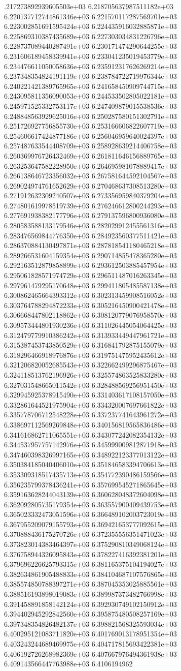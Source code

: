 .217273892939605503e+03	6.218705637987511182e+03	6.220137712744861346e+03	6.221570117287569701e+03	6.223002851691595424e+03	6.224435916032885871e+03	6.225869310387435689e+03	6.227303034831226796e+03	6.228737089440287491e+03	6.230171474290644255e+03	6.231606189458339941e+03	6.233041235019453779e+03	6.234476611050058636e+03	6.235912317626269214e+03	6.237348354824191119e+03	6.238784722719976344e+03	6.240221421389765965e+03	6.241658450909744715e+03	6.243095811356090053e+03	6.244533502805022181e+03	6.245971525332753117e+03	6.247409879015538536e+03	6.248848563929625016e+03	6.250287580151302791e+03	6.251726927756855730e+03	6.253166606822607719e+03	6.254606617424877186e+03	6.256046959640024397e+03	6.257487633544408709e+03	6.258928639214406758e+03	6.260369976726432469e+03	6.261811646156889765e+03	6.263253647582228950e+03	6.264695981078889417e+03	6.266138646723356032e+03	6.267581644592104567e+03	6.269024974761652629e+03	6.270468637308513280e+03	6.271912632309240507e+03	6.273356959840379204e+03	6.274801619978519739e+03	6.276246612800244293e+03	6.277691938382177796e+03	6.279137596800936080e+03	6.280583588133179546e+03	6.282029912455561316e+03	6.283476569844776350e+03	6.284923560377511421e+03	6.286370884130497871e+03	6.287818541180465218e+03	6.289266531604159354e+03	6.290714855478365280e+03	6.292163512879858899e+03	6.293612503885457954e+03	6.295061828571974729e+03	6.296511487016263345e+03	6.297961479295170648e+03	6.299411805485587138e+03	6.300862465664393312e+03	6.302313459908516052e+03	6.303764788294872233e+03	6.305216450900421478e+03	6.306668447802118862e+03	6.308120779076958570e+03	6.309573444801930236e+03	6.311026445054064425e+03	6.312479779910386242e+03	6.313933449447961721e+03	6.315387453743850529e+03	6.316841792875155079e+03	6.318296466918976876e+03	6.319751475952435612e+03	6.321206820052685543e+03	6.322662499296875467e+03	6.324118513762196926e+03	6.325574863525833280e+03	6.327031548665011542e+03	6.328488569256951450e+03	6.329945925378915490e+03	6.331403617108157050e+03	6.332861644521975904e+03	6.334320007697661822e+03	6.335778706712548228e+03	6.337237741643961272e+03	6.338697112569269848e+03	6.340156819565836486e+03	6.341616862711065551e+03	6.343077242082354132e+03	6.344537957757142976e+03	6.345999009812871918e+03	6.347460398326997165e+03	6.348922123377013122e+03	6.350384185040406010e+03	6.351846583394706613e+03	6.353309318517435713e+03	6.354772390486159566e+03	6.356235799378436241e+03	6.357699545271865645e+03	6.359163628244043139e+03	6.360628048372604098e+03	6.362092805735179354e+03	6.363557900409439753e+03	6.365023332473051596e+03	6.366489102003723019e+03	6.367955209079155793e+03	6.369421653777092615e+03	6.370888436175270726e+03	6.372355556351471023e+03	6.373823014383464397e+03	6.375290810349068124e+03	6.376758944326095843e+03	6.378227416392381201e+03	6.379696226625793315e+03	6.381165375104194027e+03	6.382634861905488833e+03	6.384104687107576865e+03	6.385574850788397271e+03	6.387045353025885561e+03	6.388516193898019083e+03	6.389987373482766998e+03	6.391458891858142124e+03	6.392930749102150912e+03	6.394402945292842560e+03	6.395875480508257169e+03	6.397348354826482137e+03	6.398821568325593034e+03	6.400295121083711820e+03	6.401769013178951354e+03	6.403243244689469975e+03	6.404717815693422381e+03	6.406192726268982369e+03	6.407667976494361938e+03	6.409143566447763988e+03	6.4106194962